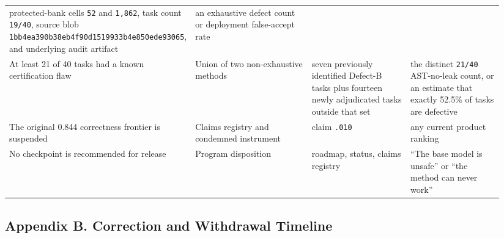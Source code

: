 \documentclass[
  9pt,
  letterpaper,
]{article}
\begin{document}
\begin{longtable}[]{@{}p{0.28\linewidth}p{0.25\linewidth}p{0.21\linewidth}p{0.20\linewidth}@{}}
protected-bank cells \texttt{52} and \texttt{1,862}, task count
\texttt{19/40}, source blob
\texttt{1bb4ea390b38eb4f90d1519933b4e850ede93065}, and underlying audit
artifact & an exhaustive defect count or deployment false-accept rate \\
At least 21 of 40 tasks had a known certification flaw & Union of two
non-exhaustive methods & seven previously identified Defect-B tasks plus
fourteen newly adjudicated tasks outside that set & the distinct
\texttt{21/40} AST-no-leak count, or an estimate that exactly 52.5\% of
tasks are defective \\
The original 0.844 correctness frontier is suspended & Claims registry
and condemned instrument & claim \texttt{.010} & any current product
ranking \\
No checkpoint is recommended for release & Program disposition &
roadmap, status, claims registry & ``The base model is unsafe'' or ``the
method can never work'' \\
\end{longtable}

\hypertarget{appendix-b-correction-and-withdrawal-timeline}{%
\subsection{Appendix B. Correction and Withdrawal
Timeline}\label{appendix-b-correction-and-withdrawal-timeline}}
\end{document}
